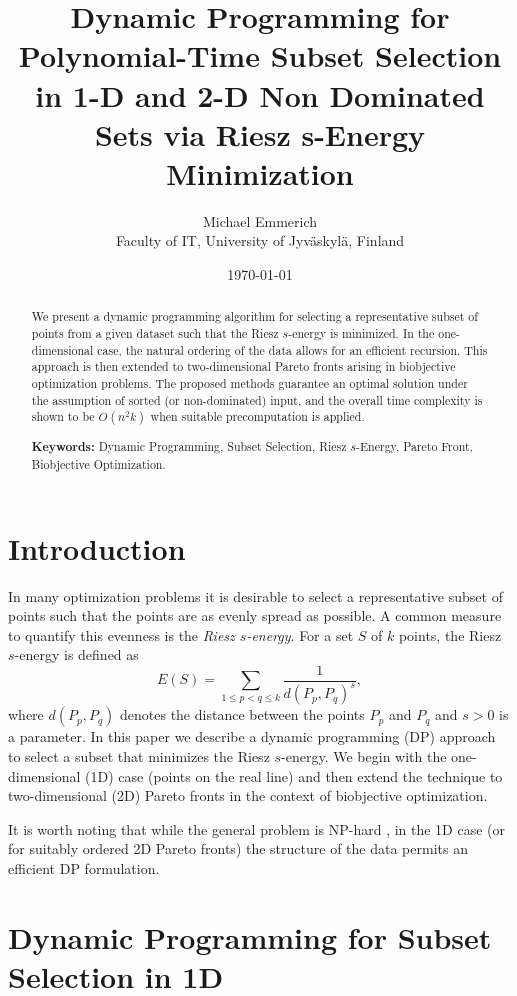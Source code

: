 \documentclass[11pt]{article}
\title{Dynamic Programming for Polynomial-Time Subset Selection in 1-D and 2-D Non Dominated Sets via Riesz 
s-Energy Minimization}
\author{Michael Emmerich\\Faculty of IT, University of Jyväskylä, Finland}
\date{\today}
\begin{document}
\maketitle

\begin{abstract}
  We present a dynamic programming algorithm for selecting a representative subset of points from a given dataset such that the Riesz \(s\)-energy is minimized. In the one-dimensional case, the natural ordering of the data allows for an efficient recursion. This approach is then extended to two-dimensional Pareto fronts arising in biobjective optimization problems. The proposed methods guarantee an optimal solution under the assumption of sorted (or non-dominated) input, and the overall time complexity is shown to be \(O(n^2 k)\) when suitable precomputation is applied.
  
  \bigskip
  \noindent\textbf{Keywords:} Dynamic Programming, Subset Selection, Riesz \(s\)-Energy, Pareto Front, Biobjective Optimization.
\end{abstract}

\section{Introduction}

In many optimization problems it is desirable to select a representative subset of points such that the points are as evenly spread as possible. A common measure to quantify this evenness is the \emph{Riesz \(s\)-energy}. For a set \(S\) of \(k\) points, the Riesz \(s\)-energy is defined as
\[
E(S)=\sum_{1\le p<q\le k}\frac{1}{d(P_p,P_q)^s},
\]
where \(d(P_p,P_q)\) denotes the distance between the points \(P_p\) and \(P_q\) and \(s>0\) is a parameter. In this paper we describe a dynamic programming (DP) approach to select a subset that minimizes the Riesz \(s\)-energy. We begin with the one-dimensional (1D) case (points on the real line) and then extend the technique to two-dimensional (2D) Pareto fronts in the context of biobjective optimization.

It is worth noting that while the general problem is NP-hard \cite{Pereverdieva2024}, in the 1D case (or for suitably ordered 2D Pareto fronts) the structure of the data permits an efficient DP formulation.

\section{Dynamic Programming for Subset Selection in 1D}
\end{document}
